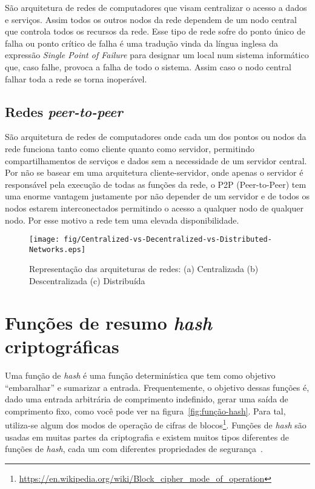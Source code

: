 São arquitetura de redes de computadores que visam centralizar o acesso a dados e serviços.
Assim todos os outros nodos da rede dependem de um nodo central que controla todos os recursos da rede.
Esse tipo de rede sofre do ponto único de falha ou ponto crítico de falha é uma tradução vinda da língua inglesa da expressão \textit{Single Point of Failure} para designar um local num sistema informático que, caso falhe, provoca a falha de todo o sistema.
Assim caso o nodo central falhar toda a rede se torna inoperável.

\subsection{Redes \textit{peer-to-peer}}

São arquitetura de redes de computadores onde cada um dos pontos ou nodos da rede funciona tanto como cliente quanto como servidor, permitindo compartilhamentos de serviços e dados sem a necessidade de um servidor central.
Por não se basear em uma arquitetura cliente-servidor, onde apenas o servidor é responsável pela execução de todas as funções da rede, o P2P (Peer-to-Peer) tem uma enorme vantagem justamente por não depender de um servidor e de todos os nodos estarem interconectados permitindo o acesso a qualquer nodo de qualquer nodo. 
Por esse motivo a rede tem uma elevada disponibilidade.%
\begin{figure}[htb!]
\centering\texttt{[image: fig/Centralized-vs-Decentralized-vs-Distributed-Networks.eps]}
\caption[Representação das arquiteturas de redes]
        {\label{fig:tipos-de-redes}Representação das arquiteturas de redes: (a) Centralizada (b) Descentralizada (c) Distribuída~\cite{Imagem1}
}
\end{figure}

\section{Funções de resumo \textit{hash} criptográficas}

Uma função de \textit{hash} é uma função determinística que tem como objetivo ``embaralhar'' e sumarizar a entrada.
Frequentemente, o objetivo dessas funções é, dado uma entrada arbitrária de comprimento indefinido, gerar uma saída de comprimento fixo, como você pode ver na figura~\ref{fig:função-hash}.
Para tal, utiliza-se algum dos modos de operação de cifras de blocos\footnote{\url{https://en.wikipedia.org/wiki/Block_cipher_mode_of_operation}}.
Funções de \textit{hash} são usadas em muitas partes da criptografia e existem muitos tipos diferentes de funções de \textit{hash}, cada um com diferentes propriedades de segurança~\cite{HASH1}.


